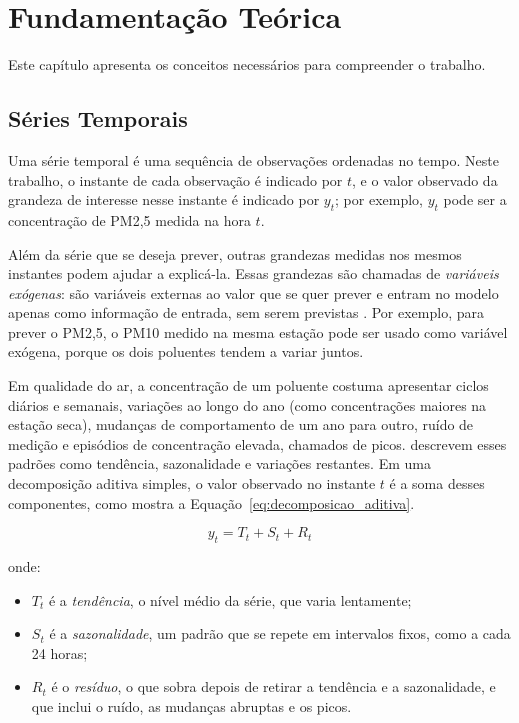 \chapter{Fundamentação Teórica}
\label{chap:fundamentacao_teorica}

Este capítulo apresenta os conceitos necessários para compreender o trabalho.

\section{Séries Temporais}
\label{sec:series_temporais}

Uma série temporal é uma sequência de observações ordenadas no tempo. Neste trabalho, o instante de cada observação é indicado por \(t\), e o valor observado da grandeza de interesse nesse instante é indicado por \(y_t\); por exemplo, \(y_t\) pode ser a concentração de PM2,5 medida na hora \(t\).

Além da série que se deseja prever, outras grandezas medidas nos mesmos instantes podem ajudar a explicá-la. Essas grandezas são chamadas de \emph{variáveis exógenas}: são variáveis externas ao valor que se quer prever e entram no modelo apenas como informação de entrada, sem serem previstas \cite{hyndman2021forecasting}. Por exemplo, para prever o PM2,5, o PM10 medido na mesma estação pode ser usado como variável exógena, porque os dois poluentes tendem a variar juntos.

Em qualidade do ar, a concentração de um poluente costuma apresentar ciclos diários e semanais, variações ao longo do ano (como concentrações maiores na estação seca), mudanças de comportamento de um ano para outro, ruído de medição e episódios de concentração elevada, chamados de picos.  descrevem esses padrões como tendência, sazonalidade e variações restantes. Em uma decomposição aditiva simples, o valor observado no instante \(t\) é a soma desses componentes, como mostra a Equação~\ref{eq:decomposicao_aditiva}.

\begin{equation}
    y_t = T_t + S_t + R_t
    \label{eq:decomposicao_aditiva}
\end{equation}

\noindent onde:
\begin{itemize}
    \item \(T_t\) é a \emph{tendência}, o nível médio da série, que varia lentamente;
    \item \(S_t\) é a \emph{sazonalidade}, um padrão que se repete em intervalos fixos, como a cada 24 horas;
    \item \(R_t\) é o \emph{resíduo}, o que sobra depois de retirar a tendência e a sazonalidade, e que inclui o ruído, as mudanças abruptas e os picos.
\end{itemize}

